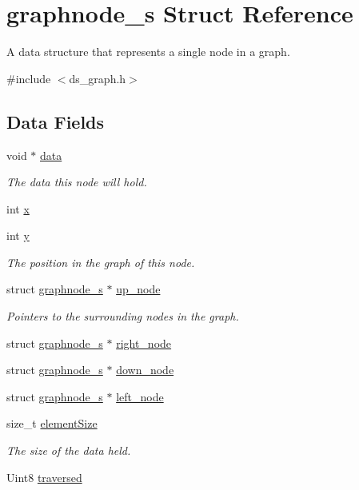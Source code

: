 \hypertarget{structgraphnode__s}{}\section{graphnode\+\_\+s Struct Reference}
\label{structgraphnode__s}


A data structure that represents a single node in a graph.  




{\ttfamily \#include $<$ds\+\_\+graph.\+h$>$}

\subsection*{Data Fields}
\begin{DoxyCompactItemize}
\item 
void $\ast$ \hyperlink{structgraphnode__s_a735984d41155bc1032e09bece8f8d66d}{data}
\begin{DoxyCompactList}\small\item\em The data this node will hold. \end{DoxyCompactList}\item 
int \hyperlink{structgraphnode__s_a6150e0515f7202e2fb518f7206ed97dc}{x}
\item 
int \hyperlink{structgraphnode__s_a0a2f84ed7838f07779ae24c5a9086d33}{y}
\begin{DoxyCompactList}\small\item\em The position in the graph of this node. \end{DoxyCompactList}\item 
struct \hyperlink{structgraphnode__s}{graphnode\+\_\+s} $\ast$ \hyperlink{structgraphnode__s_a7101dbac1154ba59495fffbdb030eba2}{up\+\_\+node}
\begin{DoxyCompactList}\small\item\em Pointers to the surrounding nodes in the graph. \end{DoxyCompactList}\item 
struct \hyperlink{structgraphnode__s}{graphnode\+\_\+s} $\ast$ \hyperlink{structgraphnode__s_a54cefd6e7df653a0115bae821fd1599c}{right\+\_\+node}
\item 
struct \hyperlink{structgraphnode__s}{graphnode\+\_\+s} $\ast$ \hyperlink{structgraphnode__s_ae504c9f7ceef062009506664d993c7db}{down\+\_\+node}
\item 
struct \hyperlink{structgraphnode__s}{graphnode\+\_\+s} $\ast$ \hyperlink{structgraphnode__s_af65e2cb312f851ac682c732ce717418b}{left\+\_\+node}
\item 
size\+\_\+t \hyperlink{structgraphnode__s_af884332e6713af9425451adde09e0024}{element\+Size}
\begin{DoxyCompactList}\small\item\em The size of the data held. \end{DoxyCompactList}\item 
Uint8 \hyperlink{structgraphnode__s_a87f4c0982d29301b2438f3c7a3e2a493}{traversed}
\end{DoxyCompactItemize}


